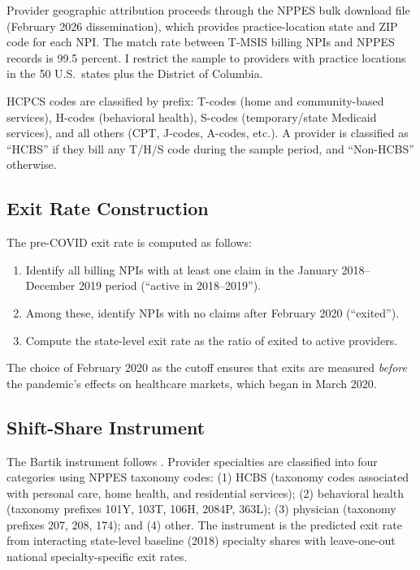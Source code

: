 \documentclass[12pt]{article}
\begin{document}
Provider geographic attribution proceeds through the NPPES bulk download file (February 2026 dissemination), which provides practice-location state and ZIP code for each NPI. The match rate between T-MSIS billing NPIs and NPPES records is 99.5 percent. I restrict the sample to providers with practice locations in the 50 U.S.\ states plus the District of Columbia.

HCPCS codes are classified by prefix: T-codes (home and community-based services), H-codes (behavioral health), S-codes (temporary/state Medicaid services), and all others (CPT, J-codes, A-codes, etc.). A provider is classified as ``HCBS'' if they bill any T/H/S code during the sample period, and ``Non-HCBS'' otherwise.

\subsection{Exit Rate Construction}

The pre-COVID exit rate is computed as follows:
\begin{enumerate}
\item Identify all billing NPIs with at least one claim in the January 2018--December 2019 period (``active in 2018--2019'').
\item Among these, identify NPIs with no claims after February 2020 (``exited'').
\item Compute the state-level exit rate as the ratio of exited to active providers.
\end{enumerate}

The choice of February 2020 as the cutoff ensures that exits are measured \emph{before} the pandemic's effects on healthcare markets, which began in March 2020.

\subsection{Shift-Share Instrument}

The Bartik instrument follows \citet{goldsmithpinkham2020}. Provider specialties are classified into four categories using NPPES taxonomy codes: (1) HCBS (taxonomy codes associated with personal care, home health, and residential services); (2) behavioral health (taxonomy prefixes 101Y, 103T, 106H, 2084P, 363L); (3) physician (taxonomy prefixes 207, 208, 174); and (4) other. The instrument is the predicted exit rate from interacting state-level baseline (2018) specialty shares with leave-one-out national specialty-specific exit rates.
\end{document}
